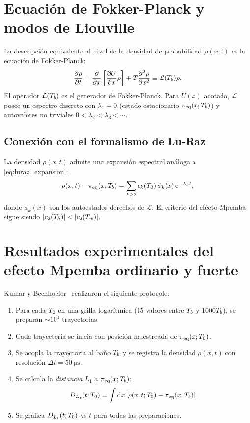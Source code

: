 \section{Ecuación de Fokker-Planck y modos de Liouville}

La descripción equivalente al nivel de la densidad de probabilidad 
$\rho(x,t)$ es la ecuación de Fokker-Planck:
\begin{equation}
    \pdv{\rho}{t} = \pdv{x}\left[\pdv{U}{x} \rho\right] + T \pdv[2]{\rho}{x} 
    \equiv \mathcal{L}(T_{b}) \rho.
    \label{eq:fokker_planck}
\end{equation}
%
El operador $\mathcal{L}(T_{b})$ es el generador de Fokker-Planck. Para 
$U(x)$ acotado, $\mathcal{L}$ posee un espectro discreto con $\lambda_1 = 0$ 
(estado estacionario $\pi_{\mathrm{eq}}(x; T_{b})$) y autovalores no triviales 
$0 < \lambda_2 < \lambda_3 < \cdots$.

\subsection{Conexión con el formalismo de Lu-Raz}

La densidad $\rho(x,t)$ admite una expansión espectral análoga a 
\cref{eq:luraz_expansion}:
\begin{equation}
    \rho(x,t) - \pi_{\mathrm{eq}}(x; T_{b}) = \sum_{k \geq 2} c_{k}(T_{0}) \, \phi_{k}(x) \, e^{-\lambda_{k} t},
\end{equation}
%
donde $\phi_{k}(x)$ son los autoestados derechos de $\mathcal{L}$. El criterio 
del efecto Mpemba sigue siendo $\abs{c_2(T_{h})} < \abs{c_2(T_{w})}$.

\section{Resultados experimentales del efecto Mpemba ordinario y fuerte}

Kumar y Bechhoefer~\cite{kumar2020} realizaron el siguiente protocolo:

\begin{enumerate}
\item Para cada $T_{0}$ en una grilla logarítmica (15 valores entre $T_{b}$ y 
$1000 T_{b}$), se preparan $\sim 10^4$ trayectorias.
\item Cada trayectoria se inicia con posición muestreada de $\pi_{\mathrm{eq}}(x; T_{0})$.
\item Se acopla la trayectoria al baño $T_{b}$ y se registra la densidad 
$\rho(x,t)$ con resolución $\Delta t = \SI{50}{\micro\second}$.
\item Se calcula la \emph{distancia $L_1$} a $\pi_{\mathrm{eq}}(x; T_{b})$:
\begin{equation}
    D_{L_{1}}(t; T_{0}) = \int \dd{x} \abs{\rho(x,t;T_{0}) - \pi_{\mathrm{eq}}(x; T_{b})}.
\end{equation}
\item Se grafica $D_{L_{1}}(t; T_{0})$ vs $t$ para todas las preparaciones.
\end{enumerate}


